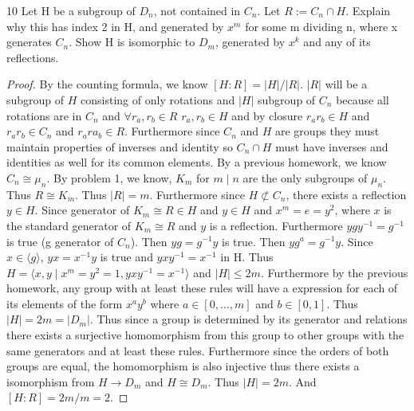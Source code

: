 \documentclass{article}
\newcommand{\abs}[1]{\lvert #1\rvert}
\newcommand{\angles}[1]{\langle{#1}\rangle}
\begin{document}
\bigskip
\begin{claim}{10}
    Let H be a subgroup of $D_n$, not contained in $C_n$. Let  $R := C_n \cap H$. Explain why this has index 2 in H, and generated by $x^m$ for some m dividing n, where x generates $C_n$. Show H is isomorphic to $D_{m}$, generated by $x^k$ and any of its reflections. 
\end{claim}
\begin{proof}
    By the counting formula, we know $[H : R] = \abs{H}/\abs{R}$. $\abs{R}$ will be a subgroup of $H$ consisting of only rotations and $\abs{H}$ subgroup of $C_n$ because all rotations are in $C_n$ and $\forall r_a, r_b \in R$ $r_a, r_b \in H$ and by closure $r_ar_b \in H$ and $r_ar_b \in C_n$ and $r_ara_b \in R$. Furthermore since $C_n$ and $H$ are groups they must maintain properties of inverses and identity so $C_n \cap H$ must have inverses and identities as well for its common elements. By a previous homework, we know $C_n \cong \mu_n$. By problem 1, we know, $K_m$ for $m \mid n$ are the only subgroups of $\mu_n$. Thus $R \cong K_m$. Thus $\abs{R} = m$. Furthermore since $H \not \subset C_n$, there exists a reflection $y \in H$. Since generator of $K_m \cong R \in H$ and $y \in H$ and $x^m = e = y^2$, where $x$ is the standard generator of $K_m \cong R$ and $y$ is a reflection. Furthermore $ygy^{-1} = g^{-1}$ is true (g generator of $C_n$). Then $yg = g^{-1}y$ is true. Then $yg^a = g^{-1}y$. Since $x \in \angles{g}$, $yx = x^{-1}y$ is true and $yxy^{-1} = x^{-1}$ in H. Thus $H = \angles{x, y \mid x^m = y^2 = 1, yxy^{-1} = x^{-1}}$ and $\abs{H} \leq 2m$. Furthermore by the previous homework, any group with at least these rules will have a expression for each of its elements of the form $x^ay^b$ where $a \in [0, \ldots, m]$ and $b \in [0, 1]$. Thus $\abs{H} = 2m = \abs{D_m}$. Thus since a group is determined by its generator and relations there exists a surjective homomorphism from this group to other groups with the same generators and at least these rules. Furthermore since the orders of both groups are equal, the homomorphism is also injective thus there exists a isomorphism from $H \to D_m$ and $H \cong D_{m}$. Thus $\abs{H} = 2m$. And $[H : R] =2m/m = 2$.
\end{proof}

\bigskip
\end{document}
